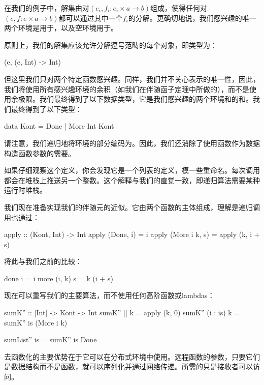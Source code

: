 \documentclass[DaoFP]{subfiles}
\begin{document}
    在我们的例子中，解集由对$(e_i, f_i \colon e_i \times a \to b)$组成，使得任何对$(e, f \colon e \times a \to b)$都可以通过其中一个$f_i$的分解。更确切地说，我们感兴趣的唯一两个环境是用于，以及空环境\hask{()}用于。

    原则上，我们的解集应该允许分解逗号范畴的每个对象，即类型为：
    \begin{haskell}
        (e, (e, Int) -> Int)
    \end{haskell}
    但这里我们只对两个特定函数感兴趣。同样，我们并不关心表示的唯一性，因此，我们将使用所有感兴趣环境的余积（如我们在伴随函子定理中所做的），而不是使用余极限。我们最终得到了以下数据类型，它是我们感兴趣的两个环境\hask{()}和的和。我们最终得到了以下类型：
    \begin{haskell}
        data Kont = Done | More Int Kont
    \end{haskell}
    请注意，我们递归地将环境的部分编码为。因此，我们还消除了使用函数作为数据构造函数参数的需要。

    如果仔细观察这个定义，你会发现它是一个列表的定义，模一些重命名。每次调用都会在堆栈上推送另一个整数。这个解释与我们的直觉一致，即递归算法需要某种运行时堆栈。

    我们现在准备实现我们的伴随元的近似。它由两个函数的主体组成，理解是递归调用也通过：
    \begin{haskell}
        apply :: (Kont, Int) -> Int
        apply (Done, i) = i
        apply (More i k, s) = apply (k, i + s)
    \end{haskell}
    将此与我们之前的比较：
    \begin{haskell}
        done i = i
        more (i, k) s = k (i + s)
    \end{haskell}


    现在可以重写我们的主要算法，而不使用任何高阶函数或lambdas：
    \begin{haskell}
        sumK'' :: [Int] -> Kont -> Int
        sumK'' [] k = apply (k, 0)
        sumK'' (i : is) k = sumK'' is (More i k)
    \end{haskell}

    \begin{haskell}
        sumList'' is = sumK'' is Done
    \end{haskell}

    去函数化的主要优势在于它可以在分布式环境中使用。远程函数的参数，只要它们是数据结构而不是函数，就可以序列化并通过网络传递。所需的只是接收者可以访问。
\end{document}
